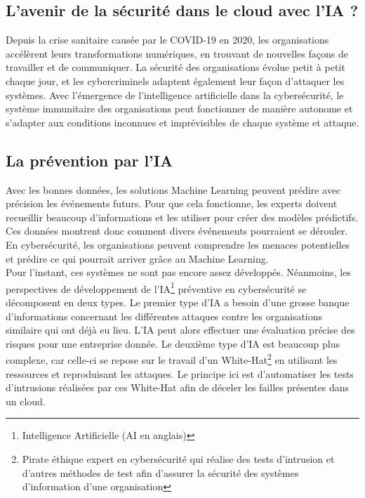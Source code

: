 \documentclass[a4paper, 12pt]{article}
\begin{document}
\begin{spacing}{1.1}
  \section{L'avenir de la sécurité dans le cloud avec l'IA ?}
    Depuis la crise sanitaire causée par le COVID-19 en 2020, les organisations
    accélèrent leurs transformations numériques, en trouvant de nouvelles façons
    de travailler et de communiquer. La sécurité des organisations évolue petit
    à petit chaque jour, et les cybercriminels adaptent également leur façon
    d'attaquer les systèmes. Avec l’émergence de l'intelligence artificielle
    dans la cybersécurité, le système immunitaire des organisations peut
    fonctionner de manière autonome et s'adapter aux conditions inconnues et
    imprévisibles de chaque système et attaque.

    \subsection{La prévention par l'IA}
      Avec les bonnes données, les solutions Machine Learning peuvent
      prédire avec précision les événements futurs. Pour que cela fonctionne,
      les experts doivent recueillir beaucoup d'informations et les utiliser
      pour créer des modèles prédictifs. Ces données montrent donc comment
      divers événements pourraient se dérouler. En cybersécurité, les
      organisations peuvent comprendre les menaces potentielles et prédire ce
      qui pourrait arriver grâce au Machine Learning. \\

      Pour l’instant, ces systèmes ne sont pas encore assez développés.
      Néanmoins, les perspectives de développement de l’IA\footnote{Intelligence
      Artificielle (AI en anglais)} préventive en cybersécurité se décomposent
      en deux types. Le premier type d'IA a besoin d’une grosse banque
      d'informations concernant les différentes attaques contre les
      organisations similaire qui ont déjà eu lieu. L'IA peut alors effectuer
      une évaluation précise des risques pour une entreprise donnée. Le deuxième
      type d’IA est beaucoup plus complexe, car celle-ci se repose sur le
      travail d’un White-Hat\footnote{Pirate éthique expert en cybersécurité qui
      réalise des tests d'intrusion et d'autres méthodes de test afin d'assurer
      la sécurité des systèmes d'information d'une organisation} en utilisant
      les ressources et reproduisant les attaques. Le principe ici est
      d’automatiser les tests d’intrusions réalisées par ces White-Hat afin de
      déceler les failles présentes dans un cloud.


\end{spacing}
\end{document}
